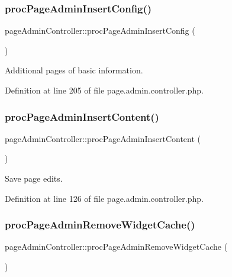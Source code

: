 \subsubsection{\texorpdfstring{proc\+Page\+Admin\+Insert\+Config()}{procPageAdminInsertConfig()}}
{\footnotesize\ttfamily page\+Admin\+Controller\+::proc\+Page\+Admin\+Insert\+Config (\begin{DoxyParamCaption}{ }\end{DoxyParamCaption})}



Additional pages of basic information. 



Definition at line 205 of file page.\+admin.\+controller.\+php.

\mbox{\label{classpageAdminController_a95d451eb68ffc5dd783a464d955724ac}} 
\subsubsection{\texorpdfstring{proc\+Page\+Admin\+Insert\+Content()}{procPageAdminInsertContent()}}
{\footnotesize\ttfamily page\+Admin\+Controller\+::proc\+Page\+Admin\+Insert\+Content (\begin{DoxyParamCaption}{ }\end{DoxyParamCaption})}



Save page edits. 



Definition at line 126 of file page.\+admin.\+controller.\+php.

\mbox{\label{classpageAdminController_a06b9c3a3052e15aa783e319c49ea8039}} 
\subsubsection{\texorpdfstring{proc\+Page\+Admin\+Remove\+Widget\+Cache()}{procPageAdminRemoveWidgetCache()}}
{\footnotesize\ttfamily page\+Admin\+Controller\+::proc\+Page\+Admin\+Remove\+Widget\+Cache (\begin{DoxyParamCaption}{ }\end{DoxyParamCaption})}



